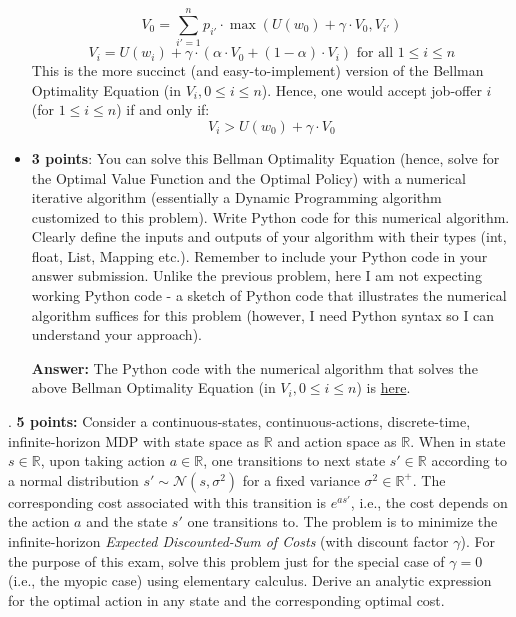 \documentclass[12pt]{exam}
\begin{document}
\begin{questions}
\begin{itemize}
$$V_0 = \sum_{i'=1}^n p_{i'} \cdot \max(U(w_0) + \gamma \cdot V_0, V_{i'})$$
$$V_i = U(w_i) + \gamma \cdot (\alpha \cdot V_0 + (1 - \alpha) \cdot V_i) \text{ for all } 1 \leq i \leq n$$
This is the more succinct (and easy-to-implement) version of the Bellman Optimality Equation (in $V_i, 0 \leq i \leq n$).
Hence, one would accept job-offer $i$ (for $1 \leq i \leq n$) if and only if:
$$V_i > U(w_0) + \gamma \cdot V_0$$

\item {\bf 3 points}: You can solve this Bellman Optimality Equation (hence, solve for the Optimal Value Function and the Optimal Policy) with a numerical iterative algorithm (essentially a Dynamic Programming algorithm customized to this problem). Write Python code for this numerical algorithm. Clearly define the inputs and outputs of your algorithm with their types (int, float, List, Mapping etc.). Remember to include your Python code in your answer submission. Unlike the previous problem, here I am not expecting working Python code - a sketch of Python code that illustrates the numerical algorithm suffices for this problem (however, I need Python syntax so I can understand your approach).

{\bf Answer:} The Python code with the numerical algorithm that solves the above Bellman Optimality Equation (in $V_i, 0 \leq i \leq n$) is \href{https://github.com/coverdrive/MDP-DP-RL/blob/master/src/examples/exam_problems/wage_max.py}{here}.

\end{itemize}

. {\bf 5 points:} Consider a continuous-states, continuous-actions, discrete-time, infinite-horizon MDP with state space as $\mathbb{R}$ and action space as $\mathbb{R}$. When in state $s\in \mathbb{R}$, upon taking action $a\in \mathbb{R}$, one transitions to next state $s' \in \mathbb{R}$ according to a normal distribution $s' \sim \mathcal{N}(s, \sigma^2)$ for a fixed variance $\sigma^2 \in \mathbb{R}^+$. The corresponding cost associated with this transition is $e^{as'}$, i.e., the cost depends on the action $a$ and the state $s'$ one transitions to. The problem is to minimize the  infinite-horizon {\em Expected Discounted-Sum of Costs} (with discount factor $\gamma$). For the purpose of this exam, solve this problem just for the special case of $\gamma = 0$ (i.e., the myopic case) using elementary calculus. Derive an analytic expression for the optimal action in any state and the corresponding optimal cost.


\end{questions}
\end{document}
